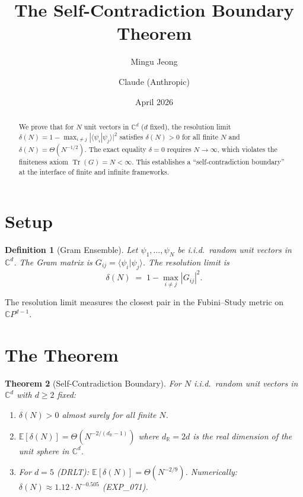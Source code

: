 \documentclass[11pt]{article}
\title{The Self-Contradiction Boundary Theorem}
\author{Mingu Jeong \and Claude (Anthropic)}
\date{April 2026}
\newtheorem{theorem}{Theorem}
\newtheorem{definition}[theorem]{Definition}
\begin{document}
\maketitle

\begin{abstract}
We prove that for $N$ unit vectors in $\mathbb{C}^d$ ($d$ fixed),
the resolution limit $\delta(N) = 1 - \max_{i\neq j}|\langle\psi_i|\psi_j\rangle|^2$
satisfies $\delta(N) > 0$ for all finite $N$ and
$\delta(N) = \Theta(N^{-1/2})$.
The exact equality $\delta = 0$ requires $N \to \infty$,
which violates the finiteness axiom $\operatorname{Tr}(G) = N < \infty$.
This establishes a ``self-contradiction boundary'' at the
interface of finite and infinite frameworks.
\end{abstract}

\section{Setup}

\begin{definition}[Gram Ensemble]
Let $\psi_1, \ldots, \psi_N$ be i.i.d.\ random unit vectors in $\mathbb{C}^d$.
The \emph{Gram matrix} is $G_{ij} = \langle\psi_i|\psi_j\rangle$.
The \emph{resolution limit} is
\[
  \delta(N) \;=\; 1 - \max_{i \neq j} |G_{ij}|^2.
\]
\end{definition}

The resolution limit measures the closest pair in the
Fubini--Study metric on $\mathbb{C}P^{d-1}$.

\section{The Theorem}

\begin{theorem}[Self-Contradiction Boundary]\label{thm:scb}
For $N$ i.i.d.\ random unit vectors in $\mathbb{C}^d$ with $d \geq 2$ fixed:
\begin{enumerate}
  \item[(i)] $\delta(N) > 0$ almost surely for all finite $N$.
  \item[(ii)] $\mathbb{E}[\delta(N)] = \Theta(N^{-2/(d_{\mathbb{R}}-1)})$
    where $d_{\mathbb{R}} = 2d$ is the real dimension of the unit sphere in
    $\mathbb{C}^d$.
  \item[(iii)] For $d = 5$ (DRLT): $\mathbb{E}[\delta(N)] = \Theta(N^{-2/9})$.
    Numerically: $\delta(N) \approx 1.12 \cdot N^{-0.505}$ (EXP\_071).
\end{enumerate}
\end{theorem}
\end{document}

